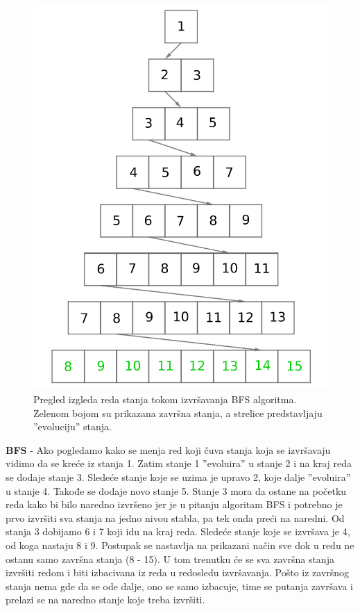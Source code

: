 \documentclass[12pt]{article}
\begin{document}
\begin{figure}[ht]
    \centering
    \includegraphics[width=0.75\linewidth]{BFS_stanja_1.png}
    \caption{Pregled izgleda reda stanja tokom izvršavanja BFS algoritma. Zelenom bojom su prikazana završna stanja, a strelice predstavljaju ''evoluciju'' stanja.}
    \label{fig:BFS_stanja}
\end{figure}
\bigbreak
\textbf{BFS} - Ako pogledamo kako se menja red koji čuva stanja koja se izvršavaju vidimo da se kreće iz stanja 1. Zatim stanje 1 ''evoluira'' u stanje 2 i na kraj reda se dodaje stanje 3. Sledeće stanje koje se uzima je upravo 2, koje dalje ''evoluira'' u stanje 4. Takođe se dodaje novo stanje 5. Stanje 3 mora da ostane na početku reda kako bi bilo naredno izvršeno jer je u pitanju algoritam BFS i potrebno je prvo izvršiti sva stanja na jedno nivou stabla, pa tek onda preći na naredni. Od stanja 3 dobijamo 6 i 7 koji idu na kraj reda. Sledeće stanje koje se izvršava je 4, od koga nastaju 8 i 9. Postupak se nastavlja na prikazani način sve dok u redu ne ostanu samo završna stanja (8 - 15). U tom trenutku će se sva završna stanja izvršiti redom i biti izbacivana iz reda u redosledu izvršavanja. Pošto iz završnog stanja nema gde da se ode dalje, ono se samo izbacuje, time se putanja završava i prelazi se na naredno stanje koje treba izvršiti. 
\end{document}
